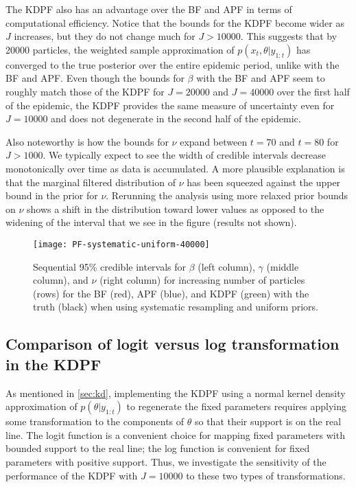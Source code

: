 \documentclass{elsarticle}
\begin{document}
The KDPF also has an advantage over the BF and APF in terms of computational efficiency. Notice that the bounds for the KDPF become wider as $J$ increases, but they do not change much for $J > 10000$. This suggests that by 20000 particles, the weighted sample approximation of $p(x_t,\theta|y_{1:t})$ has converged to the true posterior over the entire epidemic period, unlike with the BF and APF. Even though the bounds for $\beta$ with the BF and APF seem to roughly match those of the KDPF for $J = 20000$ and $J = 40000$ over the first half of the epidemic, the KDPF provides the same measure of uncertainty even for $J = 10000$ and does not degenerate in the second half of the epidemic.

Also noteworthy is how the bounds for $\nu$ expand between $t = 70$ and $t = 80$ for $J > 1000$. We typically expect to see the width of credible intervals decrease monotonically over time as data is accumulated. A more plausible explanation is that the marginal filtered distribution of $\nu$ has been squeezed against the upper bound in the prior for $\nu$. Rerunning the analysis using more relaxed prior bounds on $\nu$ shows a shift in the distribution toward lower values as opposed to the widening of the interval that we see in the figure (results not shown).

\begin{figure}
\centering
\texttt{[image: PF-systematic-uniform-40000]}
\caption{Sequential 95\% credible intervals for $\beta$ (left column), $\gamma$ (middle column), and $\nu$ (right column) for increasing number of particles (rows) for the BF (red), APF (blue), and KDPF (green) with the truth (black) when using systematic resampling and uniform priors.} \label{fig:pfs}
\end{figure}

\subsection{Comparison of logit versus log transformation in the KDPF}

As mentioned in \ref{sec:kd}, implementing the KDPF using a normal kernel density approximation of $p(\theta|y_{1:t})$ to regenerate the fixed parameters requires applying some transformation to the components of $\theta$ so that their support is on the real line. The logit function is a convenient choice for mapping fixed parameters with bounded support to the real line; the log function is convenient for fixed parameters with positive support. Thus, we investigate the sensitivity of the performance of the KDPF with $J = 10000$ to these two types of transformations.
\end{document}
